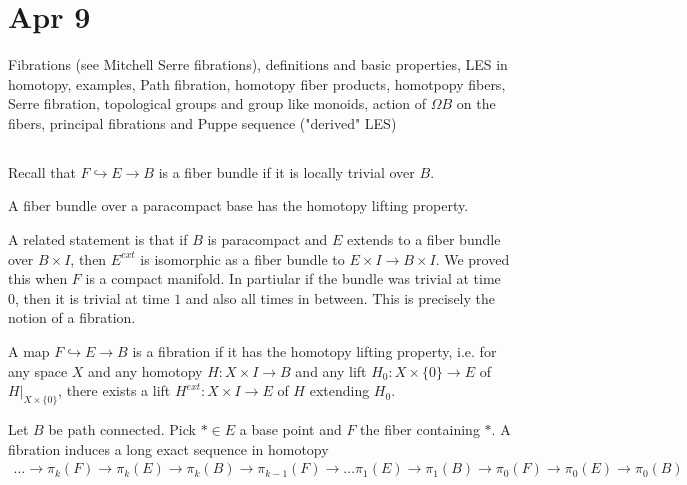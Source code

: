 \documentclass[12pt]{article}
\begin{document}
\begin{example}
    
\end{example}
\section{Apr 9}
Fibrations (see Mitchell Serre fibrations), definitions and basic properties, LES in homotopy, examples, Path fibration, homotopy fiber products, homotpopy fibers, Serre fibration, topological groups and group like monoids, action of $\Omega B$ on the fibers, principal fibrations and Puppe sequence ("derived" LES)

\subsection{}
Recall that $F\hookrightarrow E \to B$ is a fiber bundle if it is locally trivial over $B$.

\begin{theorem}
    A fiber bundle over a paracompact base has the homotopy lifting property.
\end{theorem}
A related statement is that if $B$ is paracompact and $E$ extends to a fiber bundle over $B\times I$, then $E^{ext}$ is isomorphic as a fiber bundle to $E\times I \to B\times I$. We proved this when $F$ is a compact manifold. In partiular if the bundle was trivial at time $0$, then it is trivial at time $1$ and also all times in between. This is precisely the notion of a fibration.

\begin{definition}
    A map $F \hookrightarrow E \to B$ is a fibration if it has the homotopy lifting property, i.e. for any space $X$ and any homotopy $H: X\times I \to B$ and any lift $H_0: X\times \{0\} \to E$ of $H|_{X\times \{0\}}$, there exists a lift $H^{ext}: X\times I \to E$ of $H$ extending $H_0$.
\end{definition}

\begin{theorem}
    Let $B$ be path connected. Pick $*\in E$ a base point and $F$ the fiber containing $*$. A fibration induces a long exact sequence in homotopy \begin{align*}
    \dots \to \pi_k(F) \to \pi_k(E) \to \pi_k(B) \to \pi_{k-1}(F) \to \dots \pi_1(E) \to \pi_1(B) \to \pi_0(F) \to \pi_0(E) \to \pi_0(B)
    \end{align*}
\end{theorem}
\end{document}
